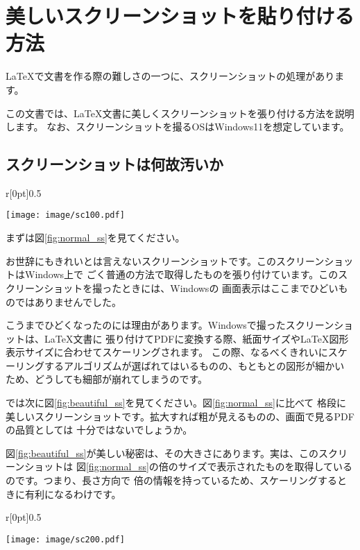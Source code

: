 \chapter{美しいスクリーンショットを貼り付ける方法}
\label{chap:screenshot}

\LaTeX で文書を作る際の難しさの一つに、スクリーンショットの処理があります。

この文書では、\LaTeX 文書に美しくスクリーンショットを張り付ける方法を説明します。
なお、スクリーンショットを撮るOSはWindows11を想定しています。

\section{スクリーンショットは何故汚いか}

\begin{wrapfigure}[11]{r}[0pt]{0.5\textwidth}
  \begin{center}
    \texttt{[image: image/sc100.pdf]}
    \caption{通常のスクリーンショット} \label{fig:normal_ss}
  \end{center}
\end{wrapfigure}

まずは図\ref{fig:normal_ss}を見てください。

お世辞にもきれいとは言えないスクリーンショットです。このスクリーンショットはWindows上で
ごく普通の方法で取得したものを張り付けています。このスクリーンショットを撮ったときには、Windowsの
画面表示はここまでひどいものではありませんでした。

こうまでひどくなったのには理由があります。Windowsで撮ったスクリーンショットは、\LaTeX 文書に
張り付けてPDFに変換する際、紙面サイズや\LaTeX 図形表示サイズに合わせてスケーリングされます。
この際、なるべくきれいにスケーリングするアルゴリズムが選ばれてはいるものの、もともとの図形が細かい
ため、どうしても細部が崩れてしまうのです。

では次に図\ref{fig:beautiful_ss}を見てください。図\ref{fig:normal_ss}に比べて
格段に美しいスクリーンショットです。拡大すれば粗が見えるものの、画面で見るPDFの品質としては
十分ではないでしょうか。

図\ref{fig:beautiful_ss}が美しい秘密は、その大きさにあります。実は、このスクリーンショットは
図\ref{fig:normal_ss}の倍のサイズで表示されたものを取得しているのです。つまり、長さ方向で
倍の情報を持っているため、スケーリングするときに有利になるわけです。

\begin{wrapfigure}[11]{r}[0pt]{0.5\textwidth}
  \begin{center}
    \texttt{[image: image/sc200.pdf]}
    \caption{200\%拡大スクリーンショット} \label{fig:beautiful_ss}
  \end{center}
\end{wrapfigure}



